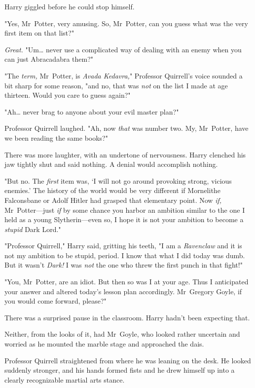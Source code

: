 Harry giggled before he could stop himself.

"Yes, Mr~Potter, very amusing. So, Mr~Potter, can you guess what was the very
first item on that list?"

\emph{Great.} "Um{\ldots} never use a complicated way of dealing with an enemy
when you can just Abracadabra them?"

"The \emph{term,} Mr~Potter, is \emph{Avada Kedavra,}" Professor Quirrell's
voice sounded a bit sharp for some reason, "and no, that was \emph{not} on the
list I made at age thirteen. Would you care to guess again?"

"Ah{\ldots} never brag to anyone about your evil master plan?"

Professor Quirrell laughed. "Ah, now \emph{that} was number two. My,
Mr~Potter, have we been reading the same books?"

There was more laughter, with an undertone of nervousness. Harry clenched his
jaw tightly shut and said nothing. A denial would accomplish nothing.

"But no. The \emph{first} item was, `I will not go around provoking strong,
vicious enemies.' The history of the world would be very different if
Mornelithe Falconsbane or Adolf Hitler had grasped that elementary point. Now
\emph{if,} Mr~Potter---just \emph{if} by some chance you harbor an ambition
similar to the one I held as a young Slytherin---even so, I hope it is not your
ambition to become a \emph{stupid} Dark Lord."

"Professor Quirrell," Harry said, gritting his teeth, "I am a \emph{Ravenclaw}
and it is not my ambition to be stupid, period. I know that what I did today
was dumb. But it wasn't \emph{Dark!} I was \emph{not} the one who threw the
first punch in that fight!"

"You, Mr~Potter, are an idiot. But then so was I at your age. Thus I
anticipated your answer and altered today's lesson plan accordingly.
Mr~Gregory Goyle, if you would come forward, please?"

There was a surprised pause in the classroom. Harry hadn't been expecting that.

Neither, from the looks of it, had Mr~Goyle, who looked rather uncertain and
worried as he mounted the marble stage and approached the dais.

Professor Quirrell straightened from where he was leaning on the desk. He
looked suddenly stronger, and his hands formed fists and he drew himself up
into a clearly recognizable martial arts stance.

